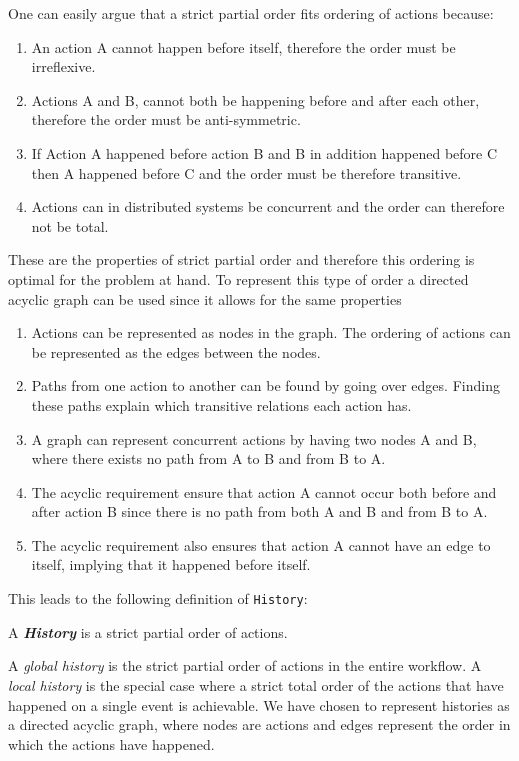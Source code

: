 	\newpar One can easily argue that a strict partial order fits ordering of actions because:
	\begin{enumerate}
		\item An action A cannot happen before itself, therefore the order must be irreflexive.
		\item Actions A and B, cannot both be happening before and after each other, therefore the order must be anti-symmetric.
		\item If Action A happened before action B and B in addition happened before C then A happened before C and the order must be therefore transitive.
		\item Actions can in distributed systems be concurrent and the order can therefore not be total.
	\end{enumerate}
	\newpar These are the properties of strict partial order and therefore this ordering is optimal for the problem at hand. To represent this type of order a directed acyclic graph can be used since it allows for the same properties
	\begin{enumerate}
		\item Actions can be represented as nodes in the graph. The ordering of actions can be represented as the edges between the nodes.
		\item Paths from one action to another can be found by going over edges. Finding these paths explain which transitive relations each action has.
		\item A graph can represent concurrent actions by having two nodes A and B, where there exists no path from A to B and from B to A.
		\item The acyclic requirement ensure that action A cannot occur both before and after action B since there is no path from both A and B and from B to A.
		\item The acyclic requirement also ensures that action A cannot have an edge to itself, implying that it happened before itself.
	\end{enumerate}
	
	\newpar This leads to the following definition of \texttt{History}:
	
	\begin{definition}
		A \textit{\textbf{History}} is a strict partial order of actions.
	\end{definition}
	
    \newpar 
    A \textit{global history} is the strict partial order of actions in the entire workflow. A \textit{local history} is the special case where a strict total order of the actions that have happened on a single event is achievable. 
	We have chosen to represent histories as a directed acyclic graph, where nodes are actions and edges represent the order in which the actions have happened.
	
